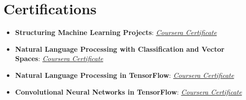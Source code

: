 \documentclass[letterpaper,10.8pt]{article}
\newcommand{\resumeItem}[2]{
	\item\small{
		\textbf{#1}{: #2 \vspace{-2pt}}
	}
}
\newcommand{\resumeSubItem}[2]{\resumeItem{#1}{#2}\vspace{-4pt}}
\newcommand{\resumeSubHeadingListStart}{\begin{itemize}[leftmargin=*]}
\newcommand{\resumeSubHeadingListEnd}{\end{itemize}}
\begin{document}
	\section{Certifications}
		\resumeSubHeadingListStart
	\resumeSubItem{Structuring Machine Learning Projects}{\href{https://coursera.org/share/985e2fa446a8c2a301d90c507abc913f}{\textit{Coursera Certificate}}}
	
	\resumeSubItem{Natural Language Processing with Classification and Vector Spaces}{\href{https://coursera.org/share/2e073afe26926b2e0cedd9c4c60a4e59}{\textit{Coursera Certificate}}}
	
	\resumeSubItem{Natural Language Processing in TensorFlow}{\href{https://coursera.org/share/ebae442c18e776da47f3159495a5cc07}{\textit{Coursera Certificate}}}
	
	\resumeSubItem{Convolutional Neural Networks in TensorFlow}{\href{https://coursera.org/share/2bf11a455ddd16087f9245830ec29639}{\textit{Coursera Certificate}}}
	
	\resumeSubHeadingListEnd
\end{document}
